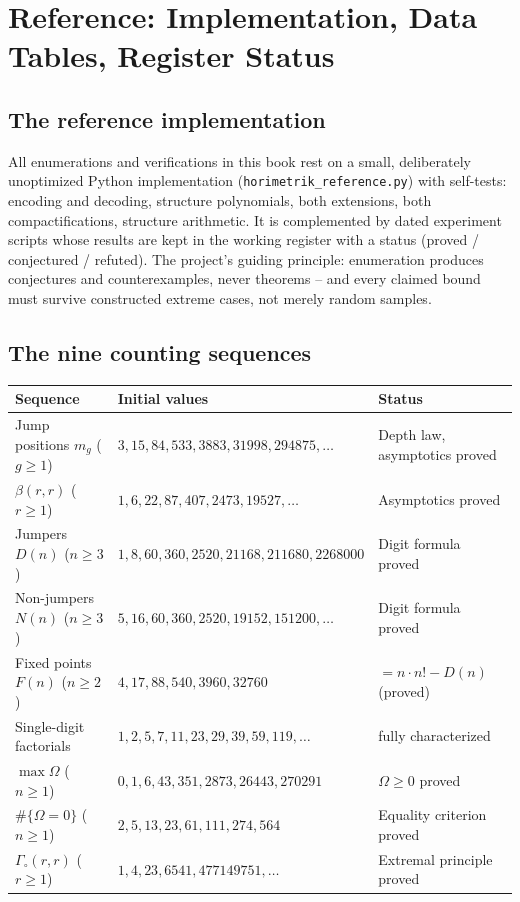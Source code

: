 \chapter{Reference: Implementation, Data Tables, Register Status}
\label{ch:anhang-referenz}

\section*{The reference implementation}

All enumerations and verifications in this book rest on a small,
deliberately unoptimized Python implementation
(\texttt{horimetrik\_reference.py}) with self-tests: encoding and
decoding, structure polynomials, both extensions, both
compactifications, structure arithmetic. It is complemented by
dated experiment scripts whose results are kept in the working
register with a status (proved / conjectured / refuted). The
project's guiding principle: enumeration produces conjectures and
counterexamples, never theorems -- and every claimed bound must
survive constructed extreme cases, not merely random samples.

\section*{The nine counting sequences}

\begin{center}
\footnotesize
\begin{tabular}{lll}
\toprule
Sequence & Initial values & Status\\
\midrule
Jump positions $m_g$ ($g{\ge}1$) & $3,15,84,533,3883,31998,294875,\ldots$ &
Depth law, asymptotics proved\\
$\beta(r,r)$ ($r{\ge}1$) & $1,6,22,87,407,2473,19527,\ldots$ & Asymptotics proved\\
Jumpers $D(n)$ ($n{\ge}3$) & $1,8,60,360,2520,21168,211680,2268000$ &
Digit formula proved\\
Non-jumpers $N(n)$ ($n{\ge}3$) & $5,16,60,360,2520,19152,151200,\ldots$ &
Digit formula proved\\
Fixed points $F(n)$ ($n{\ge}2$) & $4,17,88,540,3960,32760$ & $=n\cdot n!-D(n)$ (proved)\\
Single-digit factorials & $1,2,5,7,11,23,29,39,59,119,\ldots$ &
fully characterized\\
$\max\Omega$ ($n{\ge}1$) & $0,1,6,43,351,2873,26443,270291$ & $\Omega\ge0$
proved\\
$\#\{\Omega=0\}$ ($n{\ge}1$) & $2,5,13,23,61,111,274,564$ &
Equality criterion proved\\
$\Gamma_\circ(r,r)$ ($r{\ge}1$) & $1,4,23,6541,477149751,\ldots$ &
Extremal principle proved\\
\bottomrule
\end{tabular}
\end{center}

